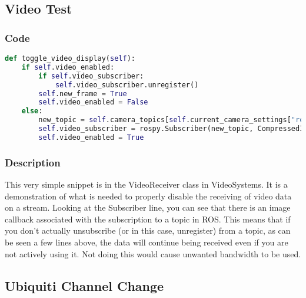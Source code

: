 \subsection{Video Test}
\subsubsection{Code}
\begin{lstlisting}[language=python]
def toggle_video_display(self):
	if self.video_enabled:
		if self.video_subscriber:
			self.video_subscriber.unregister()
		self.new_frame = True
		self.video_enabled = False
	else:
		new_topic = self.camera_topics[self.current_camera_settings["resolution"]]
		self.video_subscriber = rospy.Subscriber(new_topic, CompressedImage, self.__image_data_received_callback)
		self.video_enabled = True
\end{lstlisting}
\subsubsection{Description}
This very simple snippet is in the VideoReceiver class in VideoSystems. It is a demonstration of what is needed to properly disable the receiving of video data on a stream. Looking at the Subscriber line, you can see that there is an image callback associated with the subscription to a topic in ROS. This means that if you don't actually unsubscribe (or in this case, unregister) from a topic, as can be seen a few lines above, the data will continue being received even if you are not actively using it. Not doing this would cause unwanted bandwidth to be used.

\subsection{Ubiquiti Channel Change}
